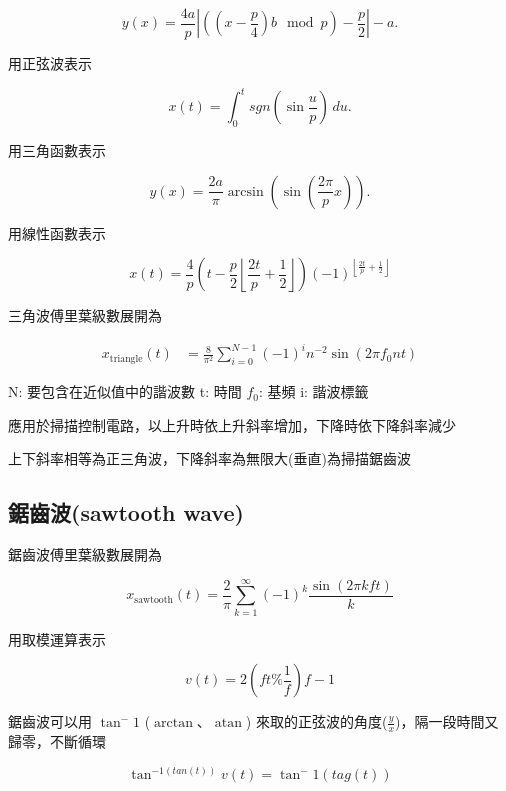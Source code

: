 \documentclass[
]{report}
\DeclareMathOperator{\atan}{atan}
\begin{document}
\[
y(x)={\frac {4a}{p}}\left|\left(\left(x-{\frac {p}{4}}\right){b \mod {p}}\right)-{\frac {p}{2}}\right|-a.
\]

用正弦波表示

\[
x(t)=\int _{0}^{t}sgn \left(\sin {\frac{u}{p}}\right)\,du.
\]

用三角函數表示

\[
y(x)={\frac {2a}{\pi }}\arcsin \left(\sin \left({\frac {2\pi }{p}}x\right)\right).
\]

用線性函數表示

\[
x(t)={\frac {4}{p}}\left(t-{\frac {p}{2}}\left\lfloor {\frac {2t}{p}}+{\frac {1}{2}}\right\rfloor \right)(-1)^{\left\lfloor {\frac {2t}{p}}+{\frac {1}{2}}\right\rfloor }
\]

三角波傅里葉級數展開為

\[
\begin{aligned}
x_{\mathrm {triangle} }(t)&{}={\frac {8}{\pi ^{2}}}\sum _{i=0}^{N-1}(-1)^{i}n^{-2}\sin \left(2\pi f_{0}nt\right)
\end{aligned}
\]

N: 要包含在近似值中的諧波數 t: 時間 \(f_0\): 基頻 i: 諧波標籤

應用於掃描控制電路，以上升時依上升斜率增加，下降時依下降斜率減少

上下斜率相等為正三角波，下降斜率為無限大(垂直)為掃描鋸齒波

\hypertarget{ux92f8ux9f52ux6ce2sawtooth-wave}{%
\subsection{鋸齒波(sawtooth
wave)}\label{ux92f8ux9f52ux6ce2sawtooth-wave}}

鋸齒波傅里葉級數展開為

\[
x_{\mathrm {sawtooth} }(t)={\frac {2}{\pi }}\sum _{k=1}^{\infty }{(-1)}^{k}{\frac {\sin(2\pi kft)}{k}}
\]

用取模運算表示

\[
v(t) = 2 (ft \% \frac{1}{f})f - 1
\]

鋸齒波可以用 \(\tan^-1\) (\(\arctan\)、\(\atan\))
來取的正弦波的角度(\(\frac{y}{x}\))，隔一段時間又歸零，不斷循環

\[
\tan^{-1(tan(t))}
v(t) = \tan^-1 (tag(t))
\]

\end{document}
